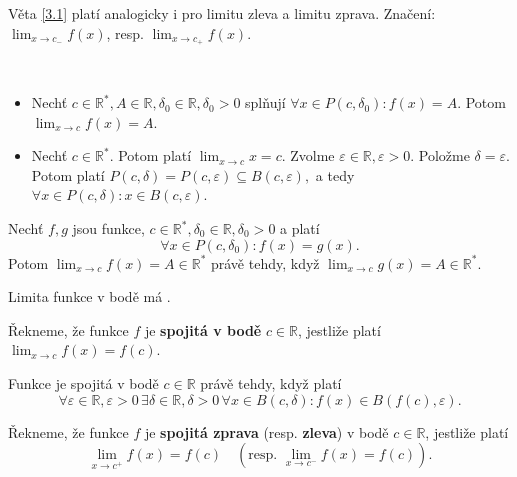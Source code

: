 \begin{poznamka}
	Věta \ref{3.1} platí analogicky i pro limitu zleva a limitu zprava. Značení: $\lim_{x\to c_-}f(x)$, resp.
	$\lim_{x\to c_+}f(x)$.
\end{poznamka}

\begin{priklad}\,
\begin{itemize}
	\item Nechť $c\in \mathbb R ^*, A \in \mathbb R ,\delta_0\in \mathbb R ,\delta_0>0$ splňují
	$\forall x \in P(c,\delta_0):f(x)=A.$
	Potom $\lim_{x\to c}f(x)=A.$
	\item Nechť $c\in \mathbb R ^*$. Potom platí $\lim_{x\to c}x=c$. Zvolme
	$\varepsilon \in \mathbb R ,\varepsilon >0$. Položme $\delta=\varepsilon$. Potom platí
	$P(c,\delta)=P(c,\varepsilon)\subseteq B(c,\varepsilon),$ a tedy
	$\forall x \in P(c,\delta):x\in B(c,\varepsilon)$.
\end{itemize}
\end{priklad}

\begin{pozorovani}
	Nechť $f,g$ jsou funkce, $c\in \mathbb R ^*, \delta_0 \in \mathbb R , \delta_0 > 0$ a platí
	$$
	    \forall x\in P(c,\delta_0): f(x)=g(x).
	$$
	Potom $\lim_{x\to c}f(x)=A\in \mathbb R ^*$ právě tehdy, když $\lim_{x\to c}g(x)=A\in \mathbb R ^*$.
\end{pozorovani}

\begin{poznamka}
	Limita funkce v bodě má .
\end{poznamka}

\begin{definice}
	Řekneme, že funkce $f$ je \textbf{spojitá v bodě} $c\in \mathbb R $, jestliže platí
	$\lim_{x\to c} f(x)=f(c)$.
\end{definice}

\begin{poznamka}
	Funkce je spojitá v bodě $c\in \mathbb R $ právě tehdy, když platí
	$$
	    \forall \varepsilon \in \mathbb R , \varepsilon > 0 \,\exists \delta \in \mathbb R , \delta > 0 \, \forall x \in B(c,\delta):f(x)\in B(f(c),\varepsilon).
	$$
\end{poznamka}

\begin{definice}
Řekneme, že funkce $f$ je \textbf{spojitá zprava} (resp. \textbf{zleva}) v bodě $c \in \mathbb{R}$,
jestliže platí
\[
\lim_{x \to c^+} f(x) = f(c)
\quad
(\text{resp. } \lim_{x \to c^-} f(x) = f(c)).
\]
\end{definice}

